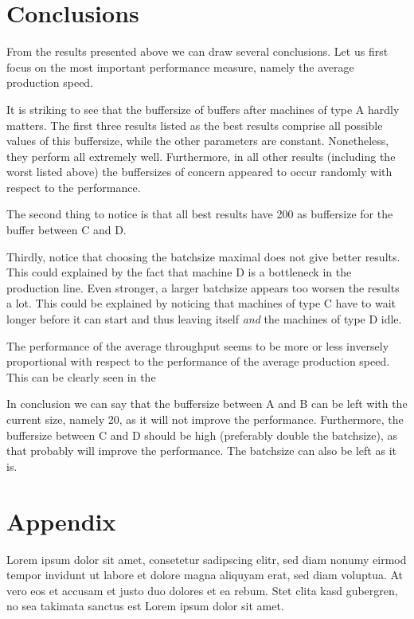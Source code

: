 \documentclass{article}
\begin{document}
\section{Conclusions}
From the results presented above we can draw several conclusions.
Let us first focus on the most important performance measure, namely the average production speed.

It is striking to see that the buffersize of buffers after machines of type A hardly matters.
The first three results listed as the best results comprise all possible values of this buffersize, while the other parameters are constant.
Nonetheless, they perform all extremely well.
Furthermore, in all other results (including the worst listed above) the buffersizes of concern appeared to occur randomly with respect to the performance.

The second thing to notice is that all best results have 200 as buffersize for the buffer between C and D.

Thirdly, notice that choosing the batchsize maximal does not give better results.
This could explained by the fact that machine D is a bottleneck in the production line.
Even stronger, a larger batchsize appears too worsen the results a lot.
This could be explained by noticing that machines of type C have to wait longer before it can start and thus leaving itself \emph{and} the machines of type D idle.


The performance of the average throughput seems to be more or less inversely proportional with respect to the performance of the average production speed.
This can be clearly seen in the 

In conclusion we can say that the buffersize between A and B can be left with the current size, namely 20, as it will not improve the performance.
Furthermore, the buffersize between C and D should be high (preferably double the batchsize), as that probably will improve the performance.
The batchsize can also be left as it is.

\section*{Appendix}
Lorem ipsum dolor sit amet, consetetur sadipscing elitr, sed diam nonumy eirmod
tempor invidunt ut labore et dolore magna aliquyam erat, sed diam voluptua. At
vero eos et accusam et justo duo dolores et ea rebum. Stet clita kasd gubergren,
no sea takimata sanctus est Lorem ipsum dolor sit amet.
\end{document}
